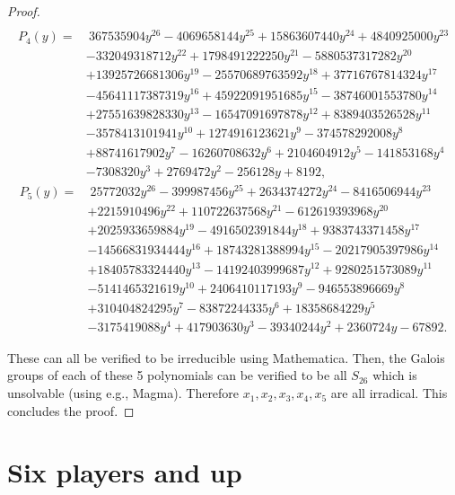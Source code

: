 \documentclass[preprint,12pt,authoryear]{elsarticle}
\begin{document}
\begin{proof}
\begin{align*}
  \end{align*}
  \begin{align*}
    P_4(y)=&~367535904 y^{26}-4069658144 y^{25}+15863607440 y^{24}+4840925000 y^{23}\\
    &-332049318712 y^{22}+1798491222250 y^{21}-5880537317282 y^{20}\\
    &+13925726681306 y^{19}-25570689763592 y^{18}+37716767814324 y^{17}\\
    &-45641117387319 y^{16}+45922091951685 y^{15}-38746001553780 y^{14}\\
    &+27551639828330 y^{13}-16547091697878 y^{12}+8389403526528 y^{11}\\
    &-3578413101941 y^{10}+1274916123621 y^9-374578292008 y^8\\
    &+88741617902 y^7-16260708632 y^6+2104604912 y^5-141853168 y^4\\
    &-7308320 y^3+2769472 y^2-256128 y+8192,
  \end{align*}
  \begin{align*}
    P_5(y)=&~25772032 y^{26}-399987456 y^{25}+2634374272 y^{24}-8416506944 y^{23}\\
    &+2215910496 y^{22}+110722637568 y^{21}-612619393968 y^{20}\\
    &+2025933659884 y^{19}-4916502391844 y^{18}+9383743371458 y^{17}\\
    &-14566831934444 y^{16}+18743281388994 y^{15}-20217905397986 y^{14}\\
    &+18405783324440 y^{13}-14192403999687 y^{12}+9280251573089 y^{11}\\
    &-5141465321619 y^{10}+2406410117193 y^9-946553896669 y^8\\
    &+310404824295 y^7-83872244335 y^6+18358684229 y^5\\
    &-3175419088 y^4+417903630 y^3-39340244 y^2+2360724 y-67892.
  \end{align*}

  These can all be verified to be irreducible using Mathematica. Then, 
  the Galois groups of each of these 5 polynomials can be verified to be all $S_{26}$ which 
  is unsolvable (using e.g., Magma). Therefore $x_1,x_2,x_3,x_4,x_5$ are 
  all irradical. This concludes the proof.
\end{proof}


\section{Six players and up}\label{sec:ext}
\end{document}
